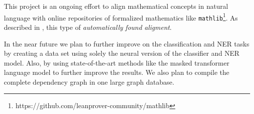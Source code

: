 \documentclass[submission,copyright,creativecommons]{eptcs}
\begin{document}
This project is an ongoing effort to align mathematical concepts
in natural language with  online repositories of formalized
mathematics like
\texttt{mathlib}\footnote{https://github.com/leanprover-community/mathlib}. 
As described in \cite{kaliszyk2016standard}, this type of \emph{automatically found aligment}.

In the near future we plan to further improve on the classification 
and NER tasks by creating a data set using solely the neural version
of the classifier and NER model. Also,  by using state-of-the-art
methods like the masked transformer language model \cite{bert} to
further improve the results. 
We also plan to compile the complete dependency graph in one 
large graph database. 








\end{document}
